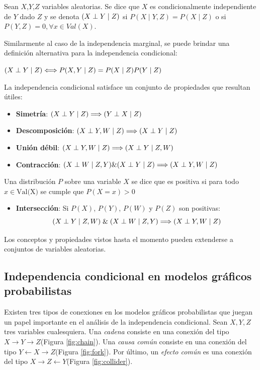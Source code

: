 \begin{dfn}
	Sean $X$,$Y$,$Z$ variables aleatorias. Se dice que $X$ es condicionalmente independiente de $Y$ dado $Z$ y se denota $(X \perp Y \mid Z)$ si $P(X \mid Y,Z)=P(X \mid Z)$ o si $P(Y,Z)=0, \forall x \in Val(X)$.
\end{dfn}

Similarmente al caso de la independencia marginal, se puede brindar una definición alternativa para la independencia condicional:

\begin{prop}
	$(X \perp Y \mid Z) \Longleftrightarrow P(X,Y \mid Z)=P(X \mid Z)P(Y \mid Z)$
\end{prop}

La independencia condicional satisface un conjunto de propiedades que resultan útiles:	
\begin{itemize}
	\item \textbf{Simetría}: $(X \perp Y \mid Z) \Longrightarrow (Y \perp X \mid Z)$
	
	\item \textbf{Descomposición}: $(X \perp Y,W \mid Z) \Longrightarrow (X \perp Y \mid Z)$
	
	\item \textbf{Unión débil}: $(X \perp Y,W \mid Z) \Longrightarrow (X \perp Y \mid Z,W)$		
	
	\item \textbf{Contracción}: $(X \perp W \mid Z,Y) \& (X \perp Y \mid Z) \Longrightarrow (X \perp Y,W \mid Z)$
	
\end{itemize}
\begin{dfn}
	Una distribución $P$ sobre una variable $X$ se dice que es positiva si para todo $x \in \text{Val(X)}$ se cumple que $P(X=x) > 0$
\end{dfn}
\begin{itemize}
	\item \textbf{Intersección}: Si $P(X)$, $P(Y)$, $P(W)$ y $P(Z)$ son positivas:
	\[ (X \perp Y \mid Z,W) \;\&\; (X \perp W \mid Z,Y) \Longrightarrow (X \perp Y,W \mid Z) \]
\end{itemize}

Los conceptos y propiedades vistos hasta el momento pueden extenderse a conjuntos de variables aleatorias.

\subsection{Independencia condicional en modelos gráficos probabilistas}
Existen tres tipos de conexiones en los modelos gráficos probabilistas que juegan un papel importante en el análisis de la independencia condicional. Sean $X, Y, Z$ tres variables cualesquiera. Una \textit{cadena} consiste en una conexión del tipo $X \rightarrow Y \rightarrow Z$(Figura \ref{fig:chain}). Una \textit{causa común} consiste en una conexión del tipo $Y \leftarrow X \rightarrow Z$(Figura \ref{fig:fork}). Por último, un \textit{efecto común} es una conexión del tipo $X \rightarrow Z \leftarrow Y$(Figura \ref{fig:collider}).

